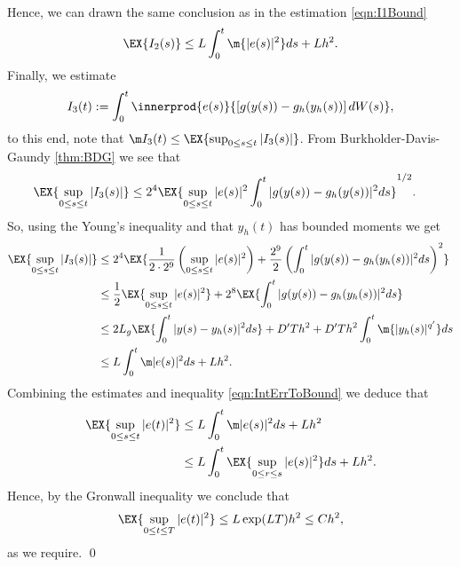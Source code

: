 \begin{pf}
\begin{align*}
	\end{align*}
	Hence, we can drawn the same conclusion  as in the estimation \eqref{eqn:I1Bound}
	\begin{equation} 
		\EX{
			I_2(s)	
		}
		\leq
		L\int_{0}^t
		\m{|e(s)|^2} ds
		+ L h^2.
	\end{equation}
	Finally, we estimate
	\begin{equation*}
		I_3(t):= 
			\int_{0}^t
				\innerprod{e(s)}{\left[g(y(s)) - g_h(y_h(s))\right] dW(s)},
	\end{equation*}
	to this end, note that 
	$
		\m I_3(t) \leq \EX{ 
				\sup_{0\leq s \leq t}
				|I_3(s)|
			}
	$.
	From Burkholder-Davis-Gaundy \eqref{thm:BDG} 	we see that
	\begin{align*}
		\EX{ 
			\sup_{0\leq s \leq t}
			|I_3(s)|
		} 
		&\leq
		2^4 
		\EX{
			\sup_{0 \leq s \leq t}
			|e(s)|^2
			\int_{0}^t
				|g(y(s))-g_h(y(s))|^2 ds
		}^{1/2}.
	\end{align*}	
	So, using the Young's inequality   and that
	$y_h(t)$ has bounded moments we get
	\begin{align}
		\EX{ 
			\sup_{0\leq s \leq t}
			|I_3(s)|
		}
		&\leq
		2^4 
		\EX{
			\frac{1}{2 \cdot 2^9}
			\left(
				\sup_{0\leq s \leq t}
				|e(s)|^2
			\right)			
			+
			\frac{2^9}{2}
			\left(
				\int_{0}^t
					|g(y(s)) - g_h(y_h(s))|^2 ds
			\right)^2
		}
		\notag \\
		&\leq
			\frac{1}{2}
			\EX{
				\sup_{0 \leq s \leq t}
				|e(s)|^2
			}
		+2^8
		\EX{
			\int_{0}^t
				|g(y(s)) - g_h(y_h(s))|^2	
			ds
		}\notag\\
		&\leq
			2 L_g
			\EX{
				\int_{0}^t
					|y(s) - y_h(s)|^2 ds		
				} 
			+D'Th^2 
			+
			D'Th^2
			\int_{0}^t
				\m{|y_h(s)|^{q'}} ds 	
		\notag \\
		&\leq
			L
			\int_{0}^t
				\m |e(s)|^2 ds
			+L h^2. \label{eqn:I3Bound}
	\end{align}
	Combining the estimates  and inequality \eqref{eqn:IntErrToBound} we deduce that
	\begin{align*}
		\EX{
			\sup_{0\leq s \leq t}	
			|e(t)|^2
		}
		&\leq
			L \int_0^t
				\m |e(s)|^2 ds
			+
			L h^2 \notag \\			
%
		&\leq		
			L \int_{0}^t
				\EX{
					\sup_{0\leq r \leq s}
					|e(s)|^2	
				}ds
			+Lh^2.		
	\end{align*}
	Hence, by the Gronwall inequality we conclude that
	\begin{equation*}
		\EX{
			\sup_{0 \leq t \leq T} 	
			|e(t)|^2
		}
		\leq
			L  \exp(LT) h^2 \leq C h^2,
	\end{equation*} 	
	as we require.
		\qed
\end{pf}

